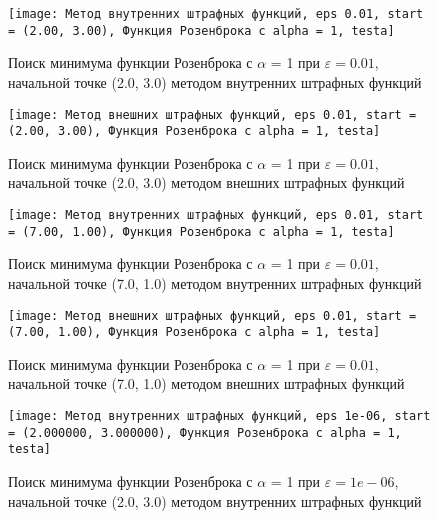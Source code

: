             \begin{figure}[H]
	        \centering
	        \texttt{[image: Метод внутренних штрафных функций, eps 0.01, start = (2.00, 3.00), Функция Розенброка с alpha = 1, testa]}%
	        \caption{Поиск минимума функции Розенброка с $\alpha$ = 1 при $\varepsilon = 0.01$, начальной точке (2.0, 3.0) методом внутренних штрафных функций}
	        \vspace*{-1.2cm}
            \end{figure}
            
            \begin{figure}[H]
	        \centering
	        \texttt{[image: Метод внешних штрафных функций, eps 0.01, start = (2.00, 3.00), Функция Розенброка с alpha = 1, testa]}%
	        \caption{Поиск минимума функции Розенброка с $\alpha$ = 1 при $\varepsilon = 0.01$, начальной точке (2.0, 3.0) методом внешних штрафных функций}
	        \vspace*{-1.2cm}
            \end{figure}
            
            \begin{figure}[H]
	        \centering
	        \texttt{[image: Метод внутренних штрафных функций, eps 0.01, start = (7.00, 1.00), Функция Розенброка с alpha = 1, testa]}%
	        \caption{Поиск минимума функции Розенброка с $\alpha$ = 1 при $\varepsilon = 0.01$, начальной точке (7.0, 1.0) методом внутренних штрафных функций}
	        \vspace*{-1.2cm}
            \end{figure}
            
            \begin{figure}[H]
	        \centering
	        \texttt{[image: Метод внешних штрафных функций, eps 0.01, start = (7.00, 1.00), Функция Розенброка с alpha = 1, testa]}%
	        \caption{Поиск минимума функции Розенброка с $\alpha$ = 1 при $\varepsilon = 0.01$, начальной точке (7.0, 1.0) методом внешних штрафных функций}
	        \vspace*{-1.2cm}
            \end{figure}
            
            \begin{figure}[H]
	        \centering
	        \texttt{[image: Метод внутренних штрафных функций, eps 1e-06, start = (2.000000, 3.000000), Функция Розенброка с alpha = 1, testa]}%
	        \caption{Поиск минимума функции Розенброка с $\alpha$ = 1 при $\varepsilon = 1e-06$, начальной точке (2.0, 3.0) методом внутренних штрафных функций}
	        \vspace*{-1.2cm}
            \end{figure}
            
